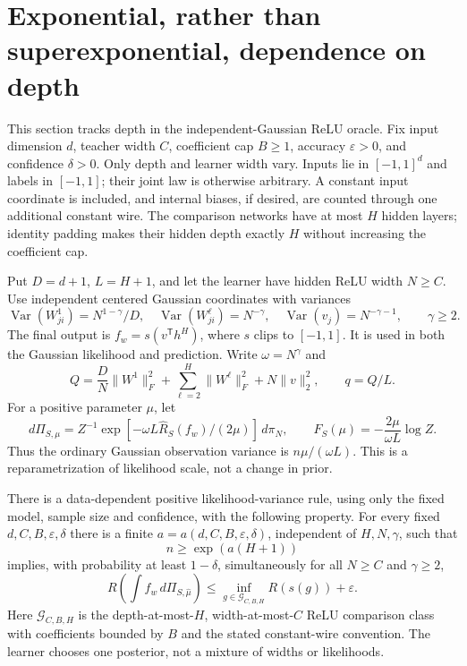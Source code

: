 \section{Exponential, rather than superexponential, dependence on depth}
\label{sec:normalized-depth}
This section tracks depth in the independent-Gaussian ReLU oracle. Fix input dimension $d$, teacher width $C$, coefficient cap $B\ge1$, accuracy $\varepsilon>0$, and confidence $\delta>0$. Only depth and learner width vary. Inputs lie in $[-1,1]^d$ and labels in $[-1,1]$; their joint law is otherwise arbitrary. A constant input coordinate is included, and internal biases, if desired, are counted through one additional constant wire. The comparison networks have at most $H$ hidden layers; identity padding makes their hidden depth exactly $H$ without increasing the coefficient cap.

Put $D=d+1$, $L=H+1$, and let the learner have hidden ReLU width $N\ge C$. Use independent centered Gaussian coordinates with variances
\[
 \operatorname{Var}(W^1_{ji})=N^{1-\gamma}/D,
 \quad \operatorname{Var}(W^\ell_{ji})=N^{-\gamma},
 \quad \operatorname{Var}(v_j)=N^{-\gamma-1},
 \qquad \gamma\ge2.
\]
The final output is $f_w=s(v^{\mathsf T}h^H)$, where $s$ clips to $[-1,1]$. It is used in both the Gaussian likelihood and prediction. Write $\omega=N^\gamma$ and
\[
 Q=\frac DN\|W^1\|_F^2+\sum_{\ell=2}^H\|W^\ell\|_F^2+N\|v\|_2^2,
 \qquad q=Q/L.
\]
For a positive parameter $\mu$, let
\[
 d\Pi_{S,\mu}=Z^{-1}\exp[-\omega L\widehat R_S(f_w)/(2\mu)]\,d\pi_N,
 \qquad F_S(\mu)=-\frac{2\mu}{\omega L}\log Z.
\]
Thus the ordinary Gaussian observation variance is $n\mu/(\omega L)$. This is a reparametrization of likelihood scale, not a change in prior.

\begin{theorem}
\label{thm:exp-depth-ReLU}
There is a data-dependent positive likelihood-variance rule, using only the fixed model, sample size and confidence, with the following property. For every fixed $d,C,B,\varepsilon,\delta$ there is a finite $a=a(d,C,B,\varepsilon,\delta)$, independent of $H,N,\gamma$, such that
\[
 n\ge\exp(a(H+1))
\]
implies, with probability at least $1-\delta$, simultaneously for all $N\ge C$ and $\gamma\ge2$,
\[
 R\left(\int f_w\,d\Pi_{S,\widehat\mu}\right)
 \le\inf_{g\in\mathcal G_{C,B,H}}R(s(g))+\varepsilon.
\]
Here $\mathcal G_{C,B,H}$ is the depth-at-most-$H$, width-at-most-$C$ ReLU comparison class with coefficients bounded by $B$ and the stated constant-wire convention. The learner chooses one posterior, not a mixture of widths or likelihoods.
\end{theorem}

